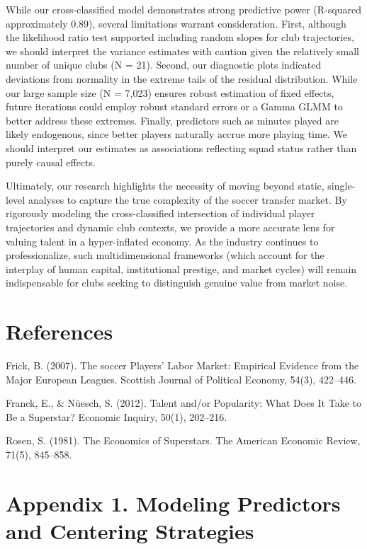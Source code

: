 \documentclass[
  12pt]{article}
\begin{document}
While our cross-classified model demonstrates strong predictive power
(R-squared approximately 0.89), several limitations warrant
consideration. First, although the likelihood ratio test supported
including random slopes for club trajectories, we should interpret the
variance estimates with caution given the relatively small number of
unique clubs (N = 21). Second, our diagnostic plots indicated deviations
from normality in the extreme tails of the residual distribution. While
our large sample size (N = 7,023) ensures robust estimation of fixed
effects, future iterations could employ robust standard errors or a
Gamma GLMM to better address these extremes. Finally, predictors such as
minutes played are likely endogenous, since better players naturally
accrue more playing time. We should interpret our estimates as
associations reflecting squad status rather than purely causal effects.

Ultimately, our research highlights the necessity of moving beyond
static, single-level analyses to capture the true complexity of the
soccer transfer market. By rigorously modeling the cross-classified
intersection of individual player trajectories and dynamic club
contexts, we provide a more accurate lens for valuing talent in a
hyper-inflated economy. As the industry continues to professionalize,
such multidimensional frameworks (which account for the interplay of
human capital, institutional prestige, and market cycles) will remain
indispensable for clubs seeking to distinguish genuine value from market
noise.

\newpage

\section{References}\label{references}

Frick, B. (2007). The soccer Players' Labor Market: Empirical Evidence
from the Major European Leagues. Scottish Journal of Political Economy,
54(3), 422--446.

Franck, E., \& Nüesch, S. (2012). Talent and/or Popularity: What Does It
Take to Be a Superstar? Economic Inquiry, 50(1), 202--216.

Rosen, S. (1981). The Economics of Superstars. The American Economic
Review, 71(5), 845--858.

\newpage

\section{Appendix 1. Modeling Predictors and Centering
Strategies}\label{appendix-1.-modeling-predictors-and-centering-strategies}
\end{document}
